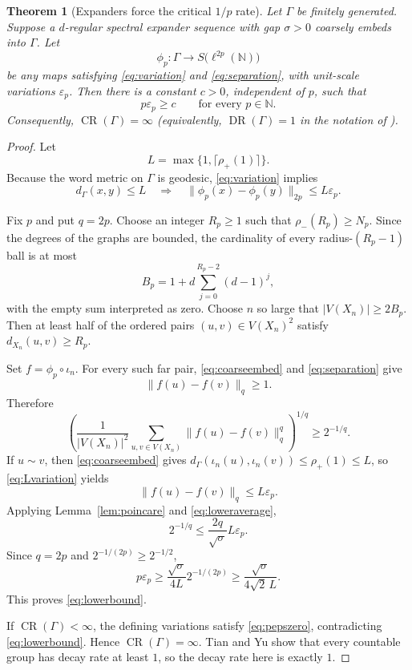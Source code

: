 \documentclass[11pt]{article}
\newtheorem{theorem}{Theorem}[section]
\newcommand{\CR}{\operatorname{CR}}
\newcommand{\DR}{\operatorname{DR}}
\newcommand{\N}{\mathbb N}
\newcommand{\eps}{\varepsilon}
\newcommand{\Sphere}{S}
\begin{document}
\begin{theorem}[Expanders force the critical $1/p$ rate]\label{thm:expanderobstruction}
Let $\Gamma$ be finitely generated.  Suppose a $d$-regular spectral expander sequence with gap $\sigma>0$ coarsely embeds into $\Gamma$.  Let
\[
  \phi_p:\Gamma\to \Sphere\bigl(\ell^{2p}(\N)\bigr)
\]
be any maps satisfying \eqref{eq:variation} and \eqref{eq:separation}, with unit-scale variations $\eps_p$.  Then there is a constant $c>0$, independent of $p$, such that
\begin{equation}
  p\eps_p\ge c \qquad\text{for every }p\in\N.
  \label{eq:lowerbound}\tag{3.3}
\end{equation}
Consequently, $\CR(\Gamma)=\infty$ (equivalently, $\DR(\Gamma)=1$ in the notation of \cite{TianYu2026}).
\end{theorem}

\begin{proof}
Let
\[
  L=\max\bigl\{1,\lceil\rho_+(1)\rceil\bigr\}.
\]
Because the word metric on $\Gamma$ is geodesic, \eqref{eq:variation} implies
\begin{equation}
 d_\Gamma(x,y)\le L
 \quad\Longrightarrow\quad
 \|\phi_p(x)-\phi_p(y)\|_{2p}\le L\eps_p.
 \label{eq:Lvariation}\tag{3.4}
\end{equation}

Fix $p$ and put $q=2p$.  Choose an integer $R_p\ge1$ such that $\rho_-(R_p)\ge N_p$.  Since the degrees of the graphs are bounded, the cardinality of every radius-$(R_p-1)$ ball is at most
\[
  B_p=1+d\sum_{j=0}^{R_p-2}(d-1)^j,
\]
with the empty sum interpreted as zero.  Choose $n$ so large that $|V(X_n)|\ge 2B_p$.  Then at least half of the ordered pairs $(u,v)\in V(X_n)^2$ satisfy $d_{X_n}(u,v)\ge R_p$.

Set $f=\phi_p\circ\iota_n$.  For every such far pair, \eqref{eq:coarseembed} and \eqref{eq:separation} give
\[
  \|f(u)-f(v)\|_q\ge1.
\]
Therefore
\begin{equation}
 \left(
   \frac{1}{|V(X_n)|^2}
   \sum_{u,v\in V(X_n)}\|f(u)-f(v)\|_q^q
 \right)^{1/q}
 \ge 2^{-1/q}.
 \label{eq:loweraverage}\tag{3.5}
\end{equation}
If $u\sim v$, then \eqref{eq:coarseembed} gives
$d_\Gamma(\iota_n(u),\iota_n(v))\le\rho_+(1)\le L$, so \eqref{eq:Lvariation} yields
\[
  \|f(u)-f(v)\|_q\le L\eps_p.
\]
Applying Lemma~\ref{lem:poincare} and \eqref{eq:loweraverage},
\[
  2^{-1/q}
  \le \frac{2q}{\sqrt\sigma}L\eps_p.
\]
Since $q=2p$ and $2^{-1/(2p)}\ge2^{-1/2}$,
\[
  p\eps_p
  \ge \frac{\sqrt\sigma}{4L}2^{-1/(2p)}
  \ge \frac{\sqrt\sigma}{4\sqrt2\,L}.
\]
This proves \eqref{eq:lowerbound}.

If $\CR(\Gamma)<\infty$, the defining variations satisfy \eqref{eq:pepszero}, contradicting \eqref{eq:lowerbound}.  Hence $\CR(\Gamma)=\infty$.  Tian and Yu show that every countable group has decay rate at least $1$, so the decay rate here is exactly $1$.
\end{proof}
\end{document}
